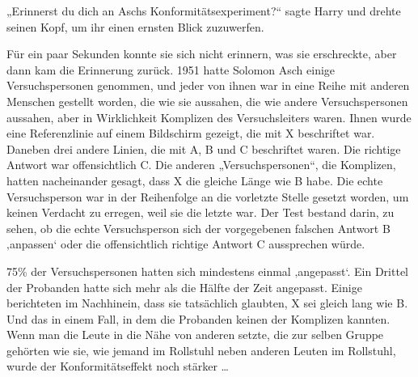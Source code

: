 „Erinnerst du dich an Aschs Konformitätsexperiment?“ sagte Harry und drehte seinen Kopf, um ihr einen ernsten Blick zuzuwerfen.

Für ein paar Sekunden konnte sie sich nicht erinnern, was sie erschreckte, aber dann kam die Erinnerung zurück. 1951 hatte Solomon Asch einige Versuchspersonen genommen, und jeder von ihnen war in eine Reihe mit anderen Menschen gestellt worden, die wie sie aussahen, die wie andere Versuchspersonen aussahen, aber in Wirklichkeit Komplizen des Versuchsleiters waren. Ihnen wurde eine Referenzlinie auf einem Bildschirm gezeigt, die mit X beschriftet war. Daneben drei andere Linien, die mit A, B und C beschriftet waren. Die richtige Antwort war offensichtlich C. Die anderen
„Versuchspersonen“, die Komplizen, hatten nacheinander gesagt, dass X die gleiche Länge wie B habe. Die echte Versuchsperson war in der Reihenfolge an die vorletzte Stelle gesetzt worden, um keinen Verdacht zu erregen, weil sie die letzte war. Der Test bestand darin, zu sehen, ob die echte Versuchsperson sich der vorgegebenen falschen Antwort B ‚anpassen‘ oder die offensichtlich richtige Antwort C aussprechen würde.

75\% der Versuchspersonen hatten sich mindestens einmal ‚angepasst‘. Ein Drittel der Probanden hatte sich mehr als die Hälfte der Zeit angepasst. Einige berichteten im Nachhinein, dass sie tatsächlich glaubten, X sei gleich lang wie B. Und das in einem Fall, in dem die Probanden keinen der Komplizen kannten. Wenn man die Leute in die Nähe von anderen setzte, die zur selben Gruppe gehörten wie sie, wie jemand im Rollstuhl neben anderen Leuten im Rollstuhl, wurde der Konformitätseffekt noch stärker …

